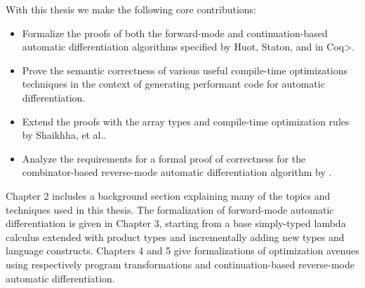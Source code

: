 With this thesis we make the following core contributions:
\begin{itemize}
  \item Formalize the proofs of both the forward-mode and continuation-based automatic differentiation algorithms specified by Huot, Staton, and \Vakar{} \cite{huot2020correctness} in \<Coq>.
  \item Prove the semantic correctness of various useful compile-time optimizations techniques in the context of generating performant code for automatic differentiation.
  \item Extend the proofs with the array types and compile-time optimization rules by Shaikhha, et al.\cite{Shaikha2019}.
  \item Analyze the requirements for a formal proof of correctness for the combinator-based reverse-mode automatic differentiation algorithm by \Vakar{}\cite{vkr2020reverse}.
\end{itemize}

Chapter 2 includes a background section explaining many of the topics and techniques used in this thesis. The formalization of forward-mode automatic differentiation is given in Chapter 3, starting from a base simply-typed lambda calculus extended with product types and incrementally adding new types and language constructs. Chapters 4 and 5 give formalizations of optimization avenues using respectively program transformations and continuation-based reverse-mode automatic differentiation.

